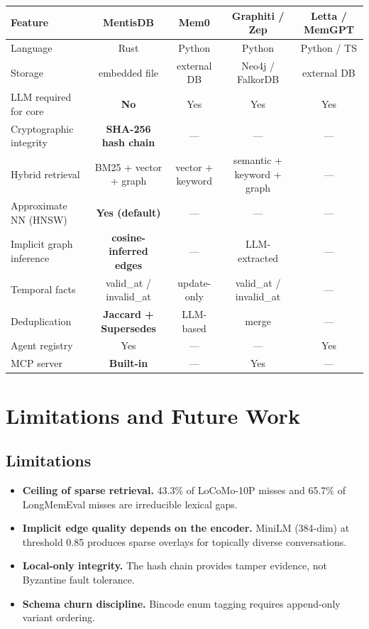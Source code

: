 \documentclass[11pt,a4paper]{article}
\begin{document}
\begin{longtable}{lcccc}
\toprule
Feature & \textbf{MentisDB} & Mem0 & Graphiti / Zep & Letta / MemGPT \\
\midrule
Language & Rust & Python & Python & Python / TS \\
Storage & embedded file & external DB & Neo4j / FalkorDB & external DB \\
LLM required for core & \textbf{No} & Yes & Yes & Yes \\
Cryptographic integrity & \textbf{SHA-256 hash chain} & — & — & — \\
Hybrid retrieval & BM25 + vector + graph & vector + keyword & semantic + keyword + graph & — \\
Approximate NN (HNSW) & \textbf{Yes (default)} & — & — & — \\
Implicit graph inference & \textbf{cosine-inferred edges} & — & LLM-extracted & — \\
Temporal facts & valid\_at / invalid\_at & update-only & valid\_at / invalid\_at & — \\
Deduplication & \textbf{Jaccard + Supersedes} & LLM-based & merge & — \\
Agent registry & Yes & — & — & Yes \\
MCP server & \textbf{Built-in} & — & Yes & — \\
\bottomrule
\end{longtable}

\section{Limitations and Future Work}

\subsection{Limitations}

\begin{itemize}
  \item \textbf{Ceiling of sparse retrieval.} 43.3\% of LoCoMo-10P misses and 65.7\% of
    LongMemEval misses are irreducible lexical gaps.
  \item \textbf{Implicit edge quality depends on the encoder.} MiniLM (384-dim) at
    threshold 0.85 produces sparse overlays for topically diverse conversations.
  \item \textbf{Local-only integrity.} The hash chain provides tamper evidence, not
    Byzantine fault tolerance.
  \item \textbf{Schema churn discipline.} Bincode enum tagging requires append-only
    variant ordering.
\end{itemize}
\end{document}

